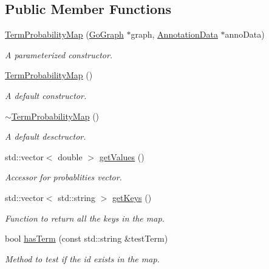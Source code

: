 \subsection*{Public Member Functions}
\begin{DoxyCompactItemize}
\item 
\hyperlink{classTermProbabilityMap_a44b7437af56eecc461983a70b5e0e5f3}{Term\+Probability\+Map} (\hyperlink{classGoGraph}{Go\+Graph} $\ast$graph, \hyperlink{classAnnotationData}{Annotation\+Data} $\ast$anno\+Data)
\begin{DoxyCompactList}\small\item\em A parameterized constructor. \end{DoxyCompactList}\item 
\hyperlink{classTermProbabilityMap_a3bddf2e9aa81dd0e1f40aa1dc4ff2713}{Term\+Probability\+Map} ()
\begin{DoxyCompactList}\small\item\em A default constructor. \end{DoxyCompactList}\item 
\hyperlink{classTermProbabilityMap_a9e409916fa3c75fb7900a3f83d7c55b9}{$\sim$\+Term\+Probability\+Map} ()
\begin{DoxyCompactList}\small\item\em A default desctructor. \end{DoxyCompactList}\item 
std\+::vector$<$ double $>$ \hyperlink{classTermProbabilityMap_ae960575c867ee0954b6beee3c10b280d}{get\+Values} ()
\begin{DoxyCompactList}\small\item\em Accessor for probablities vector. \end{DoxyCompactList}\item 
std\+::vector$<$ std\+::string $>$ \hyperlink{classTermProbabilityMap_a207545a1c1703d8be20fc0847156f2cc}{get\+Keys} ()
\begin{DoxyCompactList}\small\item\em Function to return all the keys in the map. \end{DoxyCompactList}\item 
bool \hyperlink{classTermProbabilityMap_a14087f464ea33bf0247d6034e9ee2e9f}{has\+Term} (const std\+::string \&test\+Term)
\begin{DoxyCompactList}\small\item\em Method to test if the id exists in the map. \end{DoxyCompactList}\item 

\end{DoxyCompactItemize}
